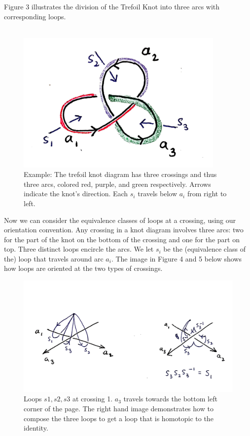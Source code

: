\documentclass{article}
\begin{document}
\begin{definition}
\noindent Figure 3 illustrates the division of the Trefoil Knot into three arcs with corresponding loops.\\\\

\begin{figure}[h!]
		\centering
		\captionsetup{width=.75\linewidth}
		\includegraphics[width=4in]{figures/tref_colors.png}
		\caption{Example: The trefoil knot diagram has three crossings and thus three arcs, colored red, purple, and green respectively. Arrows indicate the knot's direction. Each $s_i$ travels below $a_i$ from right to left.}
		\label{fig:rtinstability}
\end{figure}

\noindent Now we can consider the equivalence classes of loops at a crossing, using our orientation convention. Any crossing in a knot diagram involves three arcs: two for the part of the knot on the bottom of the crossing and one for the part on top. Three distinct loops encircle the arcs. We let $s_i$ be the (equivalence class of the) loop that travels around arc $a_i$. The image in Figure 4 and 5 below shows how loops are oriented at the two types of crossings.

\begin{figure}[h!]
		\centering
		\captionsetup{width=.75\linewidth}
		\includegraphics[width=6in]{figures/loops_s1.png}
		\caption{Loops $s1, s2, s3$ at crossing 1. $a_3$ travels towards the bottom left corner of the page. The right hand image demonstrates how to compose the three loops to get a loop that is homotopic to the identity.}
		\label{fig:rtinstability}
	\end{figure}
	

\end{definition}
\end{document}
